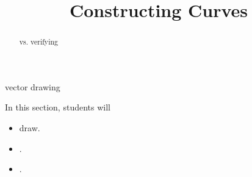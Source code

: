 \documentclass{ximera}
\title{Constructing Curves}
\begin{document}
\begin{abstract}
vs. verifying
\end{abstract}
\maketitle




vector drawing

\begin{sectionOutcomes}
In this section, students will 

\begin{itemize}
\item draw.
\item .
\item .
\end{itemize}
\end{sectionOutcomes}
\end{document}
